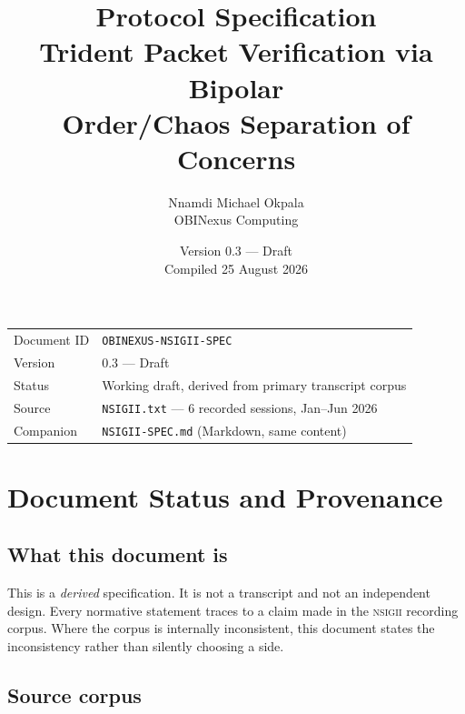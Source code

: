 \documentclass[11pt,a4paper]{article}
\title{\bfseries \NSIGII{} Protocol Specification\\[4pt]
\large Trident Packet Verification via Bipolar \CISCO{}\\
\large Order/Chaos Separation of Concerns}
\author{Nnamdi Michael Okpala \\ OBINexus Computing}
\date{Version 0.3 --- Draft \\ Compiled 25 August 2026}
\newcommand{\NSIGII}{\textsc{nsigii}}
\begin{document}
\maketitle

\begin{center}
\begin{tabular}{@{}ll@{}}
\toprule
Document ID & \texttt{OBINEXUS-NSIGII-SPEC} \\
Version & 0.3 --- Draft \\
Status & Working draft, derived from primary transcript corpus \\
Source & \texttt{NSIGII.txt} --- 6 recorded sessions, Jan--Jun 2026 \\
Companion & \texttt{NSIGII-SPEC.md} (Markdown, same content) \\
\bottomrule
\end{tabular}
\end{center}

\tableofcontents
\newpage

\section{Document Status and Provenance}

\subsection{What this document is}

This is a \emph{derived} specification. It is not a transcript and not an
independent design. Every normative statement traces to a claim made in the
\NSIGII{} recording corpus. Where the corpus is internally inconsistent, this
document states the inconsistency rather than silently choosing a side.

\subsection{Source corpus}
\end{document}
